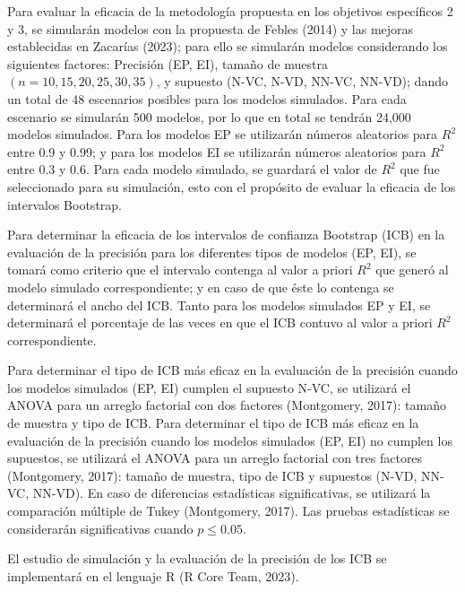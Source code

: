 Para evaluar la eficacia de la metodología propuesta en los objetivos específicos 2 y 3, se simularán modelos con la propuesta de Febles (2014) y las mejoras establecidas en Zacarías (2023); para ello se simularán modelos considerando los siguientes factores: Precisión (EP, EI), tamaño de muestra $(n=10,15,20,25,30,35)$, y supuesto (N-VC, N-VD, NN-VC, NN-VD); dando un total de 48 escenarios posibles para los modelos simulados. Para cada escenario se simularán 500 modelos, por lo que en total se tendrán 24,000 modelos simulados. Para los modelos EP se utilizarán números aleatorios para $R^{2}$  entre 0.9 y 0.99; y para los modelos EI se utilizarán números aleatorios para  $R^{2}$   entre 0.3 y 0.6. Para cada modelo simulado, se guardará el valor de $R^{2}$  que fue seleccionado para su simulación, esto con el propósito de evaluar la eficacia de los intervalos Bootstrap.
\vspace{.5cm}


Para determinar la eficacia de los intervalos de confianza Bootstrap (ICB) en la evaluación de la precisión para los diferentes tipos de modelos (EP, EI), se tomará como criterio que el intervalo contenga al valor a priori $R^{2}$ que generó al modelo simulado correspondiente; y en caso de que éste lo contenga se determinará el ancho del ICB. Tanto para los modelos simulados EP y EI, se determinará el porcentaje de las veces en que el ICB contuvo al valor a priori $R^{2}$ correspondiente.
\vspace{.5cm}

Para determinar el tipo de ICB más eficaz en la evaluación de la precisión cuando los modelos simulados (EP, EI) cumplen el supuesto N-VC, se utilizará el ANOVA para un arreglo factorial con dos factores (Montgomery, 2017): tamaño de muestra y tipo de ICB.
Para determinar el tipo de ICB más eficaz en la evaluación de la precisión cuando los modelos simulados (EP, EI) no cumplen los supuestos, se utilizará el ANOVA para un arreglo factorial con tres factores (Montgomery, 2017): tamaño de muestra, tipo de ICB y supuestos (N-VD, NN-VC, NN-VD).
En caso de diferencias estadísticas significativas, se utilizará la comparación múltiple de Tukey (Montgomery, 2017).
Las pruebas estadísticas se considerarán significativas cuando $p \leq 0.05 $.
\vspace{.5cm}

El estudio de simulación y la evaluación de la precisión de los ICB se implementará en el lenguaje R (R Core Team, 2023).



